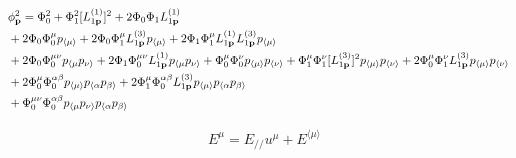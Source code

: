 \documentclass[aps,prd,preprint,nofootinbib,amsmath,amssymb,showpacs,longbibliography,singlecolumn,superscriptaddress,10pt]{revtex4-1}
\theoremstyle{plain}
\theoremstyle{definition}
\begin{document}
\begin{equation}
\begin{aligned}
&
\phi_{\mathbf{p}}^{2} 
=
\Phi_{0}^{2}
+
\Phi_{1}^{2} [L_{1 {\bf p}}^{(1)}]^{2}
+
2 \Phi_{0} \Phi_{1} L_{1 {\bf p}}^{(1)}
\\
&
+
2 \Phi_{0} \Phi_{0}^{\mu} p_{\langle \mu \rangle}
+
2 \Phi_{0} \Phi_{1}^{\mu} L_{1 {\bf p}}^{(3)} p_{\langle \mu \rangle}
+
2 \Phi_{1} \Phi_{1}^{\mu} L_{1 {\bf p}}^{(1)} L_{1 {\bf p}}^{(3)} p_{\langle \mu \rangle}
\\
&
+
2 \Phi_{0} \Phi_{0}^{\mu \nu} p_{\langle \mu } p_{ \nu \rangle}
+
2 \Phi_{1} \Phi_{0}^{\mu \nu}  L_{1 {\bf p}}^{(1)} p_{\langle \mu } p_{ \nu \rangle}
+
\Phi_{0}^{\mu} \Phi_{0}^{\nu} p_{\langle \mu \rangle}
p_{\langle \nu \rangle}
+
\Phi_{1}^{\mu} \Phi_{1}^{\nu} 
[L_{1 {\bf p}}^{(3)}]^{2}
p_{\langle \mu \rangle}
p_{\langle \nu \rangle}
+
2 \Phi_{0}^{\mu} \Phi_{1}^{\nu} L_{1 {\bf p}}^{(3)} p_{\langle \mu \rangle}
p_{\langle \nu \rangle}
\\
&
+
2 \Phi_{0}^{\mu} \Phi_{0}^{\alpha \beta} p_{\langle \mu \rangle} p_{\langle \alpha } p_{ \beta \rangle}
+
2 \Phi_{1}^{\mu} \Phi_{0}^{\alpha \beta} L_{1 {\bf p}}^{(3)} p_{\langle \mu \rangle} p_{\langle \alpha } p_{ \beta \rangle}
\\
&
+
\Phi_{0}^{\mu \nu} \Phi_{0}^{\alpha \beta}  
p_{\langle \mu } p_{ \nu \rangle}p_{\langle \alpha } p_{ \beta \rangle}
\end{aligned}
\end{equation}


\begin{equation}
\begin{aligned}
&
E^{\mu} = E_{//} u^{\mu} + E^{\langle \mu \rangle}  
\end{aligned}    
\end{equation}
\end{document}
